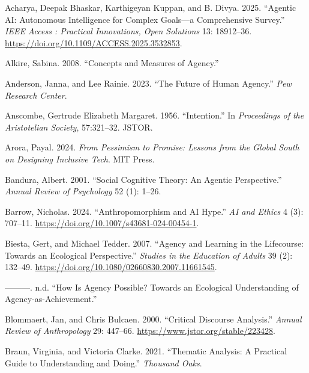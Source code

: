 \documentclass[
  letterpaper,
  DIV=11,
  numbers=noendperiod]{scrartcl}
\newlength{\cslhangindent}
\newenvironment{CSLReferences}[2] %
 {\begin{list}{}{%
  \setlength{\itemindent}{0pt}
  \setlength{\leftmargin}{0pt}
  \setlength{\parsep}{0pt}
  \ifodd #1
   \setlength{\leftmargin}{\cslhangindent}
   \setlength{\itemindent}{-1\cslhangindent}
  \fi
  \setlength{\itemsep}{#2\baselineskip}}}
 {\end{list}}
\begin{document}
\label{refs}
\begin{CSLReferences}{1}{0}
Acharya, Deepak Bhaskar, Karthigeyan Kuppan, and B. Divya. 2025.
{``Agentic {AI}: {Autonomous} Intelligence for Complex Goals---a
Comprehensive Survey.''} \emph{IEEE Access : Practical Innovations, Open
Solutions} 13: 18912--36.
\url{https://doi.org/10.1109/ACCESS.2025.3532853}.

Alkire, Sabina. 2008. {``Concepts and Measures of Agency.''}

Anderson, Janna, and Lee Rainie. 2023. {``The {Future} of {Human
Agency}.''} \emph{Pew Research Center}.

Anscombe, Gertrude Elizabeth Margaret. 1956. {``Intention.''} In
\emph{Proceedings of the Aristotelian Society}, 57:321--32. JSTOR.

Arora, Payal. 2024. \emph{From Pessimism to Promise: {Lessons} from the
{Global South} on Designing Inclusive Tech}. MIT Press.

Bandura, Albert. 2001. {``Social Cognitive Theory: {An} Agentic
Perspective.''} \emph{Annual Review of Psychology} 52 (1): 1--26.

Barrow, Nicholas. 2024. {``Anthropomorphism and {AI} Hype.''} \emph{AI
and Ethics} 4 (3): 707--11.
\url{https://doi.org/10.1007/s43681-024-00454-1}.

Biesta, Gert, and Michael Tedder. 2007. {``Agency and Learning in the
Lifecourse: {Towards} an Ecological Perspective.''} \emph{Studies in the
Education of Adults} 39 (2): 132--49.
\url{https://doi.org/10.1080/02660830.2007.11661545}.

---------. n.d. {``How Is Agency Possible? {Towards} an Ecological
Understanding of Agency-as-Achievement.''}

Blommaert, Jan, and Chris Bulcaen. 2000. {``Critical {Discourse
Analysis}.''} \emph{Annual Review of Anthropology} 29: 447--66.
\url{https://www.jstor.org/stable/223428}.

Braun, Virginia, and Victoria Clarke. 2021. {``Thematic Analysis: A
Practical Guide to Understanding and Doing.''} \emph{Thousand Oaks}.


\end{CSLReferences}
\end{document}
